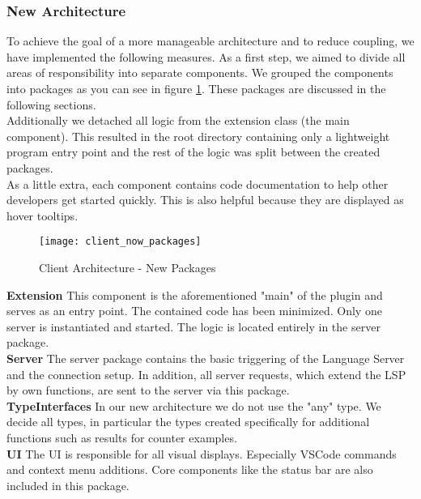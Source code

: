 \subsubsection{New Architecture}
To achieve the goal of a more manageable architecture and to reduce coupling, we have implemented the following measures.
As a first step, we aimed to divide all areas of responsibility into separate components.
We grouped the components into packages as you can see in figure \ref{fig:client_now_packages}.
These packages are discussed in the following sections. \\

Additionally we detached all logic from the extension class (the main component).
This resulted in the root directory containing only a lightweight program entry point
and the rest of the logic was split between the created packages. \\

As a little extra, each component contains code documentation to help other developers get started quickly. This is also helpful because they are displayed as hover tooltips.

\begin{figure}[H]
    \centering
    \texttt{[image: client\_now\_packages]}
    \caption{Client Architecture - New Packages}
    \label{fig:client_now_packages}
\end{figure}

{\bf Extension} \textendash{}
This component is the aforementioned "main" of the plugin and serves as an entry point. The contained code has been minimized. Only one server is instantiated and started. The logic is located entirely in the server package. \\

{\bf Server} \textendash{}
The server package contains the basic triggering of the Language Server and the connection setup. In addition, all server requests, which extend the LSP by own functions, are sent to the server via this package. \\

{\bf TypeInterfaces} \textendash{}
In our new architecture we do not use the "any" type. We decide all types, in particular the types created specifically for additional functions such as results for counter examples. \\

{\bf UI} \textendash{}
The UI is responsible for all visual displays. Especially VSCode commands and context menu additions. Core components like the status bar are also included in this package. \\

